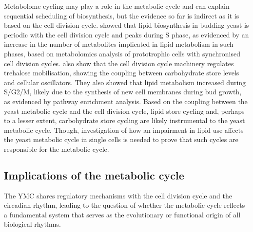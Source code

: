 
Metabolome cycling may play a role in the metabolic cycle and can explain sequential scheduling of biosynthesis, but the evidence so far is indirect as it is based on the cell division cycle.
\textcite{campbellBuildingBlocksAre2020} showed that lipid biosynthesis in budding yeast is periodic with the cell division cycle and peaks during S phase, as evidenced by an increase in the number of metabolites implicated in lipid metabolism in such phases, based on metabolomics analysis of prototrophic cells with synchronised cell division cycles.
\textcite{ewaldYeastCyclinDependentKinase2016} also show that the cell division cycle machinery regulates trehalose mobilisation, showing the coupling between carbohydrate store levels and cellular oscillators.
They also showed that lipid metabolism increased during S/G2/M, likely due to the synthesis of new cell membranes during bud growth, as evidenced by pathway enrichment analysis.
Based on the coupling between the yeast metabolic cycle and the cell division cycle, lipid store cycling and, perhaps to a lesser extent, carbohydrate store cycling are likely instrumental to the yeast metabolic cycle.
Though, investigation of how an impairment in lipid use affects the yeast metabolic cycle in single cells is needed to prove that such cycles are responsible for the metabolic cycle.


\subsection{Implications of the metabolic cycle}
\label{subsec:intro-ymc-implications}

The YMC shares regulatory mechanisms with the cell division cycle and the circadian rhythm,
leading to the question of whether the metabolic cycle reflects a fundamental system that serves as the evolutionary or functional origin of all biological rhythms.

